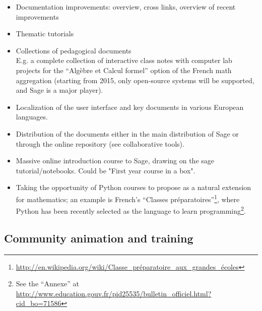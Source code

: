 \begin{itemize}
\item Documentation improvements: overview, cross links, overview of
  recent improvements
\item Thematic tutorials
\item Collections of pedagogical documents\\
  E.g. a complete collection of interactive class notes with computer
  lab projects for the ``Algèbre et Calcul formel'' option of the
  French math aggregation (starting from 2015, only open-source
  systems will be supported, and Sage is a major player).
\item Localization of the \sage user interface and key documents in
  various European languages.
\item Distribution of the documents either in the main distribution of
  Sage or through the online repository (see collaborative tools).
\item Massive online introduction course to Sage, drawing on the sage tutorial/notebooks.
Could be "First year \sage course in a box".
\item Taking the opportunity of Python courses to propose \sage as a natural extension
for mathematics; an example is French's 
``Classes pr\'eparatoires''\footnote{
\url{http://en.wikipedia.org/wiki/Classe_préparatoire_aux_grandes_écoles}}, 
where Python has been recently selected as the language to learn programming\footnote{See 
the ``Annexe'' at 
\url{http://www.education.gouv.fr/pid25535/bulletin_officiel.html?cid_bo=71586}}.
\end{itemize}


\subsection{Community animation and training}

